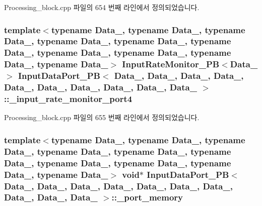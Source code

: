 Processing\+\_\+block.\+cpp 파일의 654 번째 라인에서 정의되었습니다.

\subsubsection[{\texorpdfstring{\+\_\+input\+\_\+rate\+\_\+monitor\+\_\+port4}{_input_rate_monitor_port4}}]{\setlength{\rightskip}{0pt plus 5cm}template$<$typename Data\+\_, typename Data\+\_, typename Data\+\_, typename Data\+\_, typename Data\+\_, typename Data\+\_, typename Data\+\_, typename Data\+\_, typename Data\+\_, typename Data\+\_$>$ {\bf Input\+Rate\+Monitor\+\_\+\+PB}$<$Data\+\_$>$ {\bf Input\+Data\+Port\+\_\+\+PB}$<$ Data\+\_, Data\+\_, Data\+\_, Data\+\_, Data\+\_, Data\+\_, Data\+\_, Data\+\_, Data\+\_, Data\+\_ $>$\+::\+\_\+input\+\_\+rate\+\_\+monitor\+\_\+port4\hspace{0.3cm}{\ttfamily [private]}}\hypertarget{classInputDataPort__PB_a00fa02ed776eae01fea1d37ce51dd4ab}{}\label{classInputDataPort__PB_a00fa02ed776eae01fea1d37ce51dd4ab}


Processing\+\_\+block.\+cpp 파일의 655 번째 라인에서 정의되었습니다.

\subsubsection[{\texorpdfstring{\+\_\+port\+\_\+memory}{_port_memory}}]{\setlength{\rightskip}{0pt plus 5cm}template$<$typename Data\+\_, typename Data\+\_, typename Data\+\_, typename Data\+\_, typename Data\+\_, typename Data\+\_, typename Data\+\_, typename Data\+\_, typename Data\+\_, typename Data\+\_$>$ void$\ast$ {\bf Input\+Data\+Port\+\_\+\+PB}$<$ Data\+\_, Data\+\_, Data\+\_, Data\+\_, Data\+\_, Data\+\_, Data\+\_, Data\+\_, Data\+\_, Data\+\_ $>$\+::\+\_\+port\+\_\+memory\hspace{0.3cm}{\ttfamily [private]}}\hypertarget{classInputDataPort__PB_aef86b1a63f7a759a9ed5c66bb36c6d47}{}\label{classInputDataPort__PB_aef86b1a63f7a759a9ed5c66bb36c6d47}


